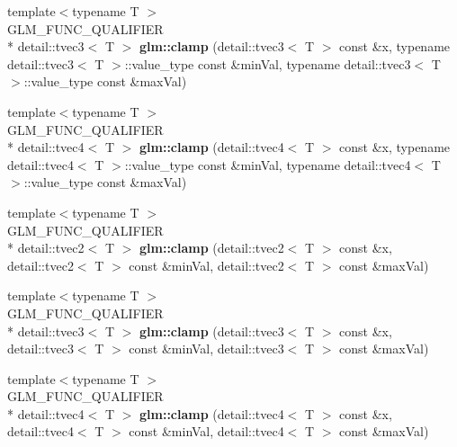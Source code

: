 \begin{DoxyCompactItemize}
\item 
\hypertarget{namespaceglm_a0cdcc0c9b89c686f79b390966be9457e}{{\footnotesize template$<$typename T $>$ }\\G\-L\-M\-\_\-\-F\-U\-N\-C\-\_\-\-Q\-U\-A\-L\-I\-F\-I\-E\-R \\*
detail\-::tvec3$<$ T $>$ {\bfseries glm\-::clamp} (detail\-::tvec3$<$ T $>$ const \&x, typename detail\-::tvec3$<$ T $>$\-::value\-\_\-type const \&min\-Val, typename detail\-::tvec3$<$ T $>$\-::value\-\_\-type const \&max\-Val)}\label{namespaceglm_a0cdcc0c9b89c686f79b390966be9457e}

\item 
\hypertarget{namespaceglm_aa132b5ea030fc61f5e542937502e9c88}{{\footnotesize template$<$typename T $>$ }\\G\-L\-M\-\_\-\-F\-U\-N\-C\-\_\-\-Q\-U\-A\-L\-I\-F\-I\-E\-R \\*
detail\-::tvec4$<$ T $>$ {\bfseries glm\-::clamp} (detail\-::tvec4$<$ T $>$ const \&x, typename detail\-::tvec4$<$ T $>$\-::value\-\_\-type const \&min\-Val, typename detail\-::tvec4$<$ T $>$\-::value\-\_\-type const \&max\-Val)}\label{namespaceglm_aa132b5ea030fc61f5e542937502e9c88}

\item 
\hypertarget{namespaceglm_a84f36f5b2d64937b9e5d6c7ea5a9af6c}{{\footnotesize template$<$typename T $>$ }\\G\-L\-M\-\_\-\-F\-U\-N\-C\-\_\-\-Q\-U\-A\-L\-I\-F\-I\-E\-R \\*
detail\-::tvec2$<$ T $>$ {\bfseries glm\-::clamp} (detail\-::tvec2$<$ T $>$ const \&x, detail\-::tvec2$<$ T $>$ const \&min\-Val, detail\-::tvec2$<$ T $>$ const \&max\-Val)}\label{namespaceglm_a84f36f5b2d64937b9e5d6c7ea5a9af6c}

\item 
\hypertarget{namespaceglm_ac1c86927b7c877d85620e44926fd663c}{{\footnotesize template$<$typename T $>$ }\\G\-L\-M\-\_\-\-F\-U\-N\-C\-\_\-\-Q\-U\-A\-L\-I\-F\-I\-E\-R \\*
detail\-::tvec3$<$ T $>$ {\bfseries glm\-::clamp} (detail\-::tvec3$<$ T $>$ const \&x, detail\-::tvec3$<$ T $>$ const \&min\-Val, detail\-::tvec3$<$ T $>$ const \&max\-Val)}\label{namespaceglm_ac1c86927b7c877d85620e44926fd663c}

\item 
\hypertarget{namespaceglm_af6385a855dccba450f5ed4090e592243}{{\footnotesize template$<$typename T $>$ }\\G\-L\-M\-\_\-\-F\-U\-N\-C\-\_\-\-Q\-U\-A\-L\-I\-F\-I\-E\-R \\*
detail\-::tvec4$<$ T $>$ {\bfseries glm\-::clamp} (detail\-::tvec4$<$ T $>$ const \&x, detail\-::tvec4$<$ T $>$ const \&min\-Val, detail\-::tvec4$<$ T $>$ const \&max\-Val)}\label{namespaceglm_af6385a855dccba450f5ed4090e592243}


\end{DoxyCompactItemize}
